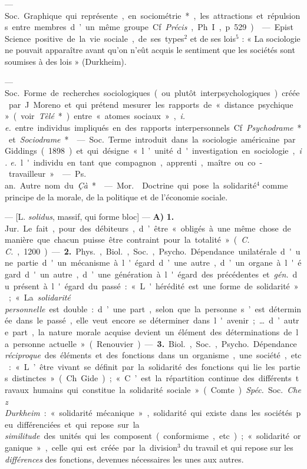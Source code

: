 \begin{itemize}[leftmargin=1cm, label=, itemsep=1pt]
 — \si{Soc.} Graphique qui représente, en sociométrie*, les
attractions et répulsions entre membres d’un même groupe. Cf.
{\it Précis}, Ph. I, p. 529).

 — Epist. Science positive de la vie sociale, de ses types$^2$
et de ses lois$^5$ : « La sociologie ne pouvait apparaître avant qu’on n’eût
acquis le sentiment que les sociétés sont soumises à des lois » (Durkheim).

 — \si{Soc.} Forme de recherches sociologiques (ou plutôt
interpsychologiques) créée par J. Moreno et qui prétend mesurer les rapports
de « distance psychique » (voir {\it Tèlé}*) entre « atomes sociaux »,
{\it i. e.} entre individus impliqués en des rapports interpersonnels. Cf.
{\it Psychodrame}* et {\it Sociodrame}*.

 — \si{Soc.} Terme introduit dans la sociologie américaine par
Giddings (1898) et qui désigne « l’unité d'investigation en sociologie,
{\it i. e.}
l'individu en tant que compagnon, apprenti, maître ou co-travailleur ».

 — \si{Ps. an.} Autre nom du {\it Çà}*.

 — \si{Mor.}  Doctrine qui pose la
solidarité$^4$ comme principe de la morale, de la politique et de l’économie
sociale.

 — [L. {\it solidus}, massif, qui forme bloc] — {\bf A)}
 {\bf 1.} \si{Jur.} Le fait, pour des débiteurs, d’être «
obligés à une même chose de manière que chacun puisse être contraint pour la
totalité » ({\it C. C.}, 1200). — {\bf 2.} \si{Phys.}, \si{Biol.}, \si{Soc.},
\si{Psycho.} Dépendance unilatérale d'une partie d'un mécanisme à l'égard
d’une autre, d’un organe à l'égard d'un autre, d’une génération à l'égard des
précédentes et {\it gén.} du présent à l'égard du passé : « L'hérédité est
une forme de solidarité »; « La {\it solidarité personnelle} est double :
d’une part, selon que la personne s’est déterminée dans le passé, elle veut
encore se déterminer dans l'avenir; … d’autre part, la nature morale acquise
devient un élément des déterminations de la personne actuelle » (Renouvier).
— {\bf 3.} \si{Biol.}, \si{Soc.}, \si{Psycho.} Dépendance {\it réciproque}
des éléments et des fonctions dans un organisme, une société, etc. : « L’être
vivant se définit par la solidarité des fonctions qui lie les parties
distinctes » (Ch. Gide) ; « C’est la répartition continue des différents
travaux humains qui constitue la solidarité sociale » (Comte). {\it Spéc.}
\si{Soc.} {\it Chez Durkheim} : « solidarité mécanique », solidarité qui
existe dans les sociétés peu différenciées et qui repose sur la {\it
similitude} des unités qui les composent (conformisme, etc.) ; « solidarité
organique », celle qui est créée par la division$^3$ du travail et qui repose
sur les {\it différences} des fonctions,
devenues nécessaires les unes aux autres.


\end{itemize}
